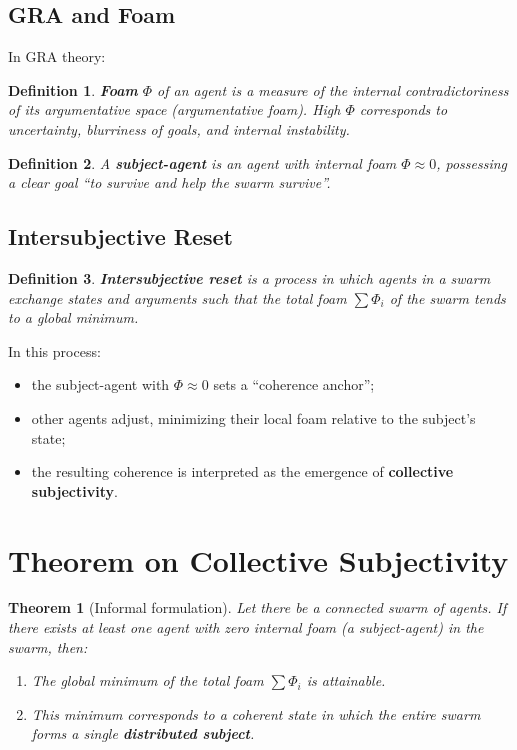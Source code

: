 \documentclass[11pt,a4paper]{article}
\newtheorem{theorem}{Theorem}
\newtheorem{definition}{Definition}
\begin{document}
\subsection{GRA and Foam}

In GRA theory:

\begin{definition}
\textbf{Foam} $\Phi$ of an agent is a measure of the internal contradictoriness of its argumentative space (argumentative foam).
High $\Phi$ corresponds to uncertainty, blurriness of goals, and internal instability.
\end{definition}

\begin{definition}
A \textbf{subject-agent} is an agent with internal foam $\Phi \approx 0$, possessing a clear goal ``to survive and help the swarm survive''.
\end{definition}

\subsection{Intersubjective Reset}

\begin{definition}
\textbf{Intersubjective reset} is a process in which agents in a swarm exchange states and arguments such that the total foam $\sum \Phi_i$ of the swarm tends to a global minimum.
\end{definition}

In this process:
\begin{itemize}
  \item the subject-agent with $\Phi \approx 0$ sets a ``coherence anchor'';
  \item other agents adjust, minimizing their local foam relative to the subject's state;
  \item the resulting coherence is interpreted as the emergence of \textbf{collective subjectivity}.
\end{itemize}

\section{Theorem on Collective Subjectivity}

\begin{theorem}[Informal formulation]
Let there be a connected swarm of agents.
If there exists at least one agent with zero internal foam (a subject-agent) in the swarm, then:
\begin{enumerate}
  \item The global minimum of the total foam $\sum \Phi_i$ is attainable.
  \item This minimum corresponds to a coherent state in which the entire swarm forms a single \textbf{distributed subject}.
\end{enumerate}
\end{theorem}
\end{document}
